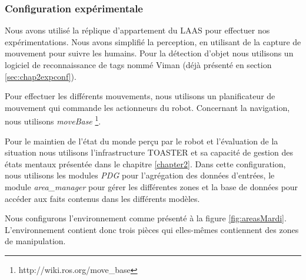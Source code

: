 \documentclass[a4paper,11pt,twoside]{StyleThese}
\begin{document}
\subsubsection{Configuration expérimentale}
Nous avons utilisé la réplique d'appartement du LAAS pour effectuer nos expérimentations. Nous avons simplifié la perception, en utilisant de la capture de mouvement pour suivre les humains. Pour la détection d'objet nous utilisons un logiciel de reconnaissance de tags nommé Viman (déjà présenté en section \ref{sec:chap2expconf}).


Pour effectuer les différents mouvements, nous utilisons un planificateur de mouvement\cite{Sisbot2008} qui commande les actionneurs du robot.
Concernant la navigation, nous utilisons \textit{moveBase} \footnote{http://wiki.ros.org/move\_base}.


Pour le maintien de l'état du monde perçu par le robot et l'évaluation de la situation nous utilisons l'infrastructure TOASTER et sa capacité de gestion des états mentaux présentée dans le chapitre \ref{chapter2}.
Dans cette configuration, nous utilisons les modules \textit{PDG} pour l'agrégation des données d'entrées, le module \textit{area\_manager} pour gérer les différentes zones et la base de données pour accéder aux faits contenus dans les différents modèles.

Nous configurons l'environnement comme présenté à la figure \ref{fig:areasMardi}.
L'environnement contient donc trois pièces qui elles-mêmes contiennent des zones de manipulation.
\end{document}
